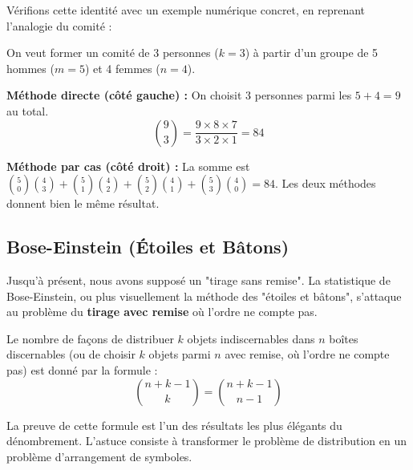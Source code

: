 Vérifions cette identité avec un exemple numérique concret, en reprenant l'analogie du comité :

\begin{examplebox}
On veut former un comité de 3 personnes ($k=3$) à partir d'un groupe de 5 hommes ($m=5$) et 4 femmes ($n=4$).

\textbf{Méthode directe (côté gauche) :}
On choisit 3 personnes parmi les $5+4=9$ au total.
$$ \binom{9}{3} = \frac{9 \times 8 \times 7}{3 \times 2 \times 1} = 84 $$

\textbf{Méthode par cas (côté droit) :}
La somme est $\binom{5}{0}\binom{4}{3} + \binom{5}{1}\binom{4}{2} + \binom{5}{2}\binom{4}{1} + \binom{5}{3}\binom{4}{0} = 84$. Les deux méthodes donnent bien le même résultat.
\end{examplebox}

\newpage

\subsection{Bose-Einstein (Étoiles et Bâtons)}

Jusqu'à présent, nous avons supposé un "tirage sans remise". La statistique de Bose-Einstein, ou plus visuellement la méthode des "étoiles et bâtons", s'attaque au problème du \textbf{tirage avec remise} où l'ordre ne compte pas.

\begin{theorembox}
Le nombre de façons de distribuer $k$ objets indiscernables dans $n$ boîtes discernables (ou de choisir $k$ objets parmi $n$ avec remise, où l'ordre ne compte pas) est donné par la formule :
$$ \binom{n+k-1}{k} = \binom{n+k-1}{n-1} $$
\end{theorembox}

La preuve de cette formule est l'un des résultats les plus élégants du dénombrement. L'astuce consiste à transformer le problème de distribution en un problème d'arrangement de symboles.

